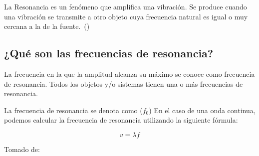 \documentclass[twocolumn, 12pt]{article}
\begin{document}
La Resonancia es un fenómeno que amplifica una vibración.
Se produce cuando una vibración se transmite a otro objeto
cuya frecuencia natural es igual o muy cercana a la de la
fuente.~(\cite{Erbessd_2022})

\subsection{¿Qué son las frecuencias de resonancia?}

La frecuencia en la que la amplitud alcanza su máximo se
conoce como frecuencia de resonancia. Todos los objetos y/o
sistemas tienen una o más frecuencias de resonancia.

La frecuencia de resonancia se denota como ($f_0$) En el
caso de una onda continua, podemos calcular la frecuencia
de resonancia utilizando la siguiente fórmula:

\begin{equation*}
    v = \lambda f
\end{equation*}

Tomado de:~\cite{Resonancia}

\printbibliography
\end{document}
